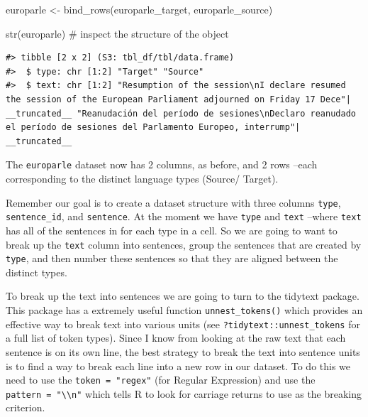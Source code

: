 \documentclass[
  letterpaper,
]{latex/krantz}
\newenvironment{Shaded}{\begin{snugshade}}{\end{snugshade}}
\newcommand{\CommentTok}[1]{\textcolor[rgb]{0.37,0.37,0.37}{#1}}
\newcommand{\FunctionTok}[1]{\textcolor[rgb]{0.28,0.35,0.67}{#1}}
\newcommand{\NormalTok}[1]{\textcolor[rgb]{0.00,0.23,0.31}{#1}}
\newcommand{\OtherTok}[1]{\textcolor[rgb]{0.00,0.23,0.31}{#1}}
\begin{document}
\begin{Shaded}
\begin{Highlighting}[]
\NormalTok{europarle }\OtherTok{\textless{}{-}} 
  \FunctionTok{bind\_rows}\NormalTok{(europarle\_target, europarle\_source)}

\FunctionTok{str}\NormalTok{(europarle) }\CommentTok{\# inspect the structure of the object}
\end{Highlighting}
\end{Shaded}

\begin{verbatim}
#> tibble [2 x 2] (S3: tbl_df/tbl/data.frame)
#>  $ type: chr [1:2] "Target" "Source"
#>  $ text: chr [1:2] "Resumption of the session\nI declare resumed the session of the European Parliament adjourned on Friday 17 Dece"| __truncated__ "Reanudación del período de sesiones\nDeclaro reanudado el período de sesiones del Parlamento Europeo, interrump"| __truncated__
\end{verbatim}

The \texttt{europarle} dataset now has 2 columns, as before, and 2 rows
--each corresponding to the distinct language types (Source/ Target).

Remember our goal is to create a dataset structure with three columns
\texttt{type}, \texttt{sentence\_id}, and \texttt{sentence}. At the
moment we have \texttt{type} and \texttt{text} --where \texttt{text} has
all of the sentences in for each type in a cell. So we are going to want
to break up the \texttt{text} column into sentences, group the sentences
that are created by \texttt{type}, and then number these sentences so
that they are aligned between the distinct types.

To break up the text into sentences we are going to turn to the tidytext
package. This package has a extremely useful function
\texttt{unnest\_tokens()} which provides an effective way to break text
into various units (see \texttt{?tidytext::unnest\_tokens} for a full
list of token types). Since I know from looking at the raw text that
each sentence is on its own line, the best strategy to break the text
into sentence units is to find a way to break each line into a new row
in our dataset. To do this we need to use the \texttt{token\ =\ "regex"}
(for Regular Expression) and use the
\texttt{pattern\ =\ "\textbackslash{}\textbackslash{}n"} which tells R
to look for carriage returns to use as the breaking criterion.
\end{document}
